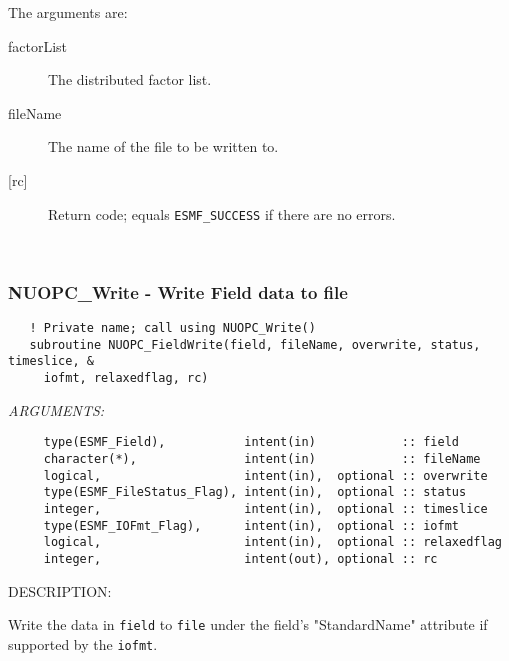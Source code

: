      The arguments are:
     \begin{description}
     \item[factorList]
       The distributed factor list.
     \item[fileName]
       The name of the file to be written to.
     \item[{[rc]}]
       Return code; equals {\tt ESMF\_SUCCESS} if there are no errors.
     \end{description}
   
 
\mbox{}\hrulefill\ 
 
\subsubsection [NUOPC\_Write] {NUOPC\_Write - Write Field data to file}


\begin{verbatim}   ! Private name; call using NUOPC_Write()
   subroutine NUOPC_FieldWrite(field, fileName, overwrite, status, timeslice, &
     iofmt, relaxedflag, rc)\end{verbatim}{\em ARGUMENTS:}
\begin{verbatim}     type(ESMF_Field),           intent(in)            :: field
     character(*),               intent(in)            :: fileName
     logical,                    intent(in),  optional :: overwrite
     type(ESMF_FileStatus_Flag), intent(in),  optional :: status
     integer,                    intent(in),  optional :: timeslice
     type(ESMF_IOFmt_Flag),      intent(in),  optional :: iofmt
     logical,                    intent(in),  optional :: relaxedflag
     integer,                    intent(out), optional :: rc\end{verbatim}
{\sf DESCRIPTION:\\ }


     Write the data in {\tt field} to {\tt file} under the field's "StandardName" 
     attribute if supported by the {\tt iofmt}.
  
